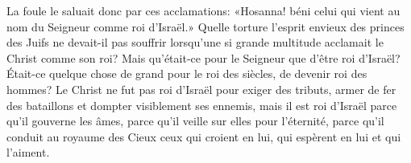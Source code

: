  La foule le saluait donc par ces acclamations:
	«Hosanna! béni celui qui vient au nom du Seigneur comme roi d’Israël.»
Quelle torture l’esprit envieux des princes des Juifs ne devait-il pas souffrir
	lorsqu’une si grande multitude acclamait le Christ comme son roi?
Mais qu’était-ce pour le Seigneur que d’être roi d’Israël?
	Était-ce quelque chose de grand pour le roi des siècles,
	de devenir roi des hommes?
Le Christ ne fut pas roi d’Israël pour exiger des tributs,
	armer de fer des bataillons et dompter visiblement ses ennemis,
	mais il est roi d’Israël parce qu’il gouverne les âmes,
	parce qu’il veille sur elles pour l’éternité,
	parce qu’il conduit au royaume des Cieux ceux qui croient en lui,
	qui espèrent en lui et qui l’aiment.
